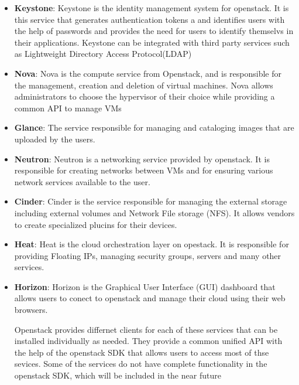\begin{itemize}
\item \textbf{Keystone}: Keystone is the identity management system for
openstack. It is this service that generates authentication tokens a and
identifies users with the help of passwords and provides the need for
users to identify themselvs in their applications. Keystone can be
integrated with third party services such as Lightweight Directory
Access Protocol(LDAP)

\item \textbf{Nova}: Nova is the compute service from Openstack, and is
responsible for the management, creation and deletion of virtual machines.
Nova allows administrators to choose the hypervisor of their choice while
providing a common API to manage VMs

\item \textbf{Glance}: The service responsible for managing and cataloging
images that are uploaded by the users.

\item \textbf{Neutron}: Neutron is a networking service provided by openstack.
It is responsible for creating networks between VMs and for ensuring various
network services available to the user.

\item \textbf{Cinder}: Cinder is the service responsible for managing the
external storage including external volumes and Network File storage (NFS).
It allows vendors to create specialized plucins for their devices.

\item \textbf{Heat}: Heat is the cloud orchestration layer on opestack. It
is responsible for providing Floating IPs, managing security groups, servers
and many other services.

\item \textbf{Horizon}: Horizon is the Graphical User Interface (GUI) dashboard
that allows users to conect to openstack and manage their cloud using their
web browsers. 

Openstack provides differnet clients for each of these services that
can be installed individually as needed. They provide a common unified
API with the help of the openstack SDK that allows users to access
most of thse sevices. Some of the services do not have complete
functionality in the openstack SDK, which will be included in the near
future

\end{itemize}

